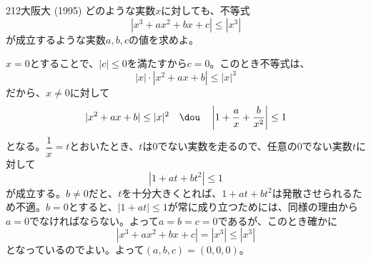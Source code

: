 \begin{thm}{212}{}{大阪大 (1995)}
 どのような実数$x$に対しても、不等式
 \[ |x^3+ax^2+bx+c| \le |x^3| \]
 が成立するような実数$a, b, c$の値を求めよ。
\end{thm}

$x=0$とすることで、$|c|\le 0$を満たすから$c=0$。このとき不等式は、
\[ |x|\cdot|x^2+ax+b| \le |x|^3 \]
だから、$x\neq 0$に対して
\[ |x^2+ax+b|\le |x|^2 \quad\dou\quad \left|1+\frac{a}{x}+\frac{b}{x^2}\right| \le 1 \]
となる。$\dfrac{1}{x}=t$とおいたとき、$t$は0でない実数を走るので、任意の0でない実数$t$に対して
\[ |1+at+bt^2| \le 1 \]
が成立する。$b\neq 0$だと、$t$を十分大きくとれば、$1+at+bt^2$は発散させられるため不適。$b=0$とすると、$|1+at|\le 1$が常に成り立つためには、同様の理由から$a=0$でなければならない。よって$a=b=c=0$であるが、このとき確かに
\[ |x^3+ax^2+bx+c|=|x^3|\le |x^3| \]
となっているのでよい。よって$(a, b, c)=(0, 0, 0)$。